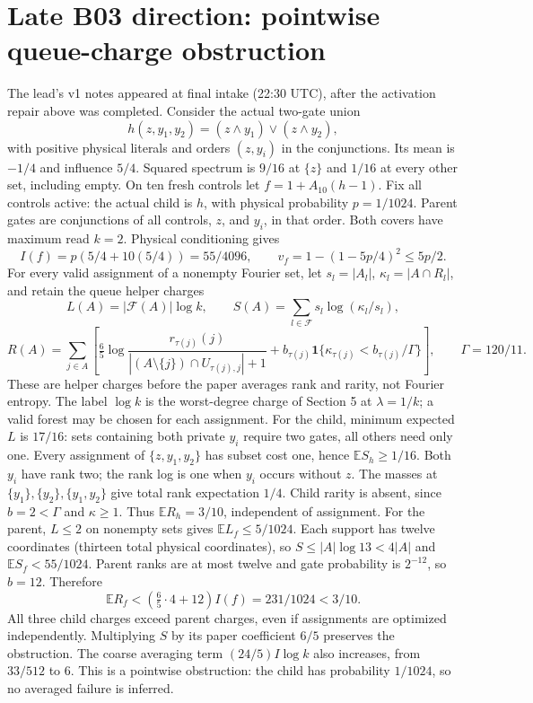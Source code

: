 \documentclass{article}
\begin{document}
\section{Late B03 direction: pointwise queue-charge obstruction}
The lead's v1 notes appeared at final intake (22:30 UTC), after the
activation repair above was completed. Consider the actual two-gate union
\[
 h(z,y_1,y_2)=(z\wedge y_1)\vee(z\wedge y_2),
\]
with positive physical literals and orders $(z,y_i)$ in the conjunctions.
Its mean is $-1/4$ and influence $5/4$. Squared spectrum is $9/16$ at
$\{z\}$ and $1/16$ at every other set, including empty.
On ten fresh controls let $f=1+A_{10}(h-1)$. Fix all controls active:
the actual child is $h$, with physical probability $p=1/1024$.
Parent gates are conjunctions of all controls, $z$, and $y_i$, in that
order. Both covers have maximum read $k=2$. Physical conditioning gives
\[
 I(f)=p(5/4+10(5/4))=55/4096,\qquad
 v_f=1-(1-5p/4)^2\le5p/2.
\]
For every valid assignment of a nonempty Fourier set, let $s_l=|A_l|$,
$\kappa_l=|A\cap R_l|$, and retain the queue helper charges
\[
 L(A)=|\mathcal F(A)|\log k,\qquad
 S(A)=\sum_{l\in\mathcal F}s_l\log(\kappa_l/s_l),
\]
\[
 R(A)=\sum_{j\in A}\left[\tfrac65\log
 \frac{r_{\tau(j)}(j)}{|(A\setminus\{j\})\cap U_{\tau(j),j}|+1}
 +b_{\tau(j)}\mathbf1\{\kappa_{\tau(j)}<b_{\tau(j)}/\Gamma\}\right],
 \qquad\Gamma=120/11.
\]
These are helper charges before the paper averages rank and rarity,
not Fourier entropy. The label $\log k$ is the worst-degree charge of
Section 5 at $\lambda=1/k$; a valid forest may be chosen for each assignment.
For the child, minimum expected $L$ is $17/16$: sets containing both
private $y_i$ require two gates, all others need only one. Every assignment
of $\{z,y_1,y_2\}$ has subset cost one, hence $\mathbb E S_h\ge1/16$.
Both $y_i$ have rank two; the rank log is one when $y_i$ occurs without
$z$. The masses at $\{y_1\},\{y_2\},\{y_1,y_2\}$ give total rank
expectation $1/4$. Child rarity is absent, since $b=2<\Gamma$ and
$\kappa\ge1$. Thus $\mathbb E R_h=3/10$, independent of assignment.
For the parent, $L\le2$ on nonempty sets gives $\mathbb E L_f\le5/1024$.
Each support has twelve coordinates (thirteen total physical coordinates),
so $S\le|A|\log13<4|A|$ and $\mathbb E S_f<55/1024$.
Parent ranks are at most twelve and gate probability is $2^{-12}$,
so $b=12$. Therefore
\[
 \mathbb E R_f<(\tfrac65\cdot4+12)I(f)=231/1024<3/10.
\]
All three child charges exceed parent charges, even if assignments are
optimized independently. Multiplying $S$ by its paper coefficient $6/5$
preserves the obstruction. The coarse averaging term $(24/5)I\log k$
also increases, from $33/512$ to $6$. This is a pointwise obstruction:
the child has probability $1/1024$, so no averaged failure is inferred.
\end{document}
